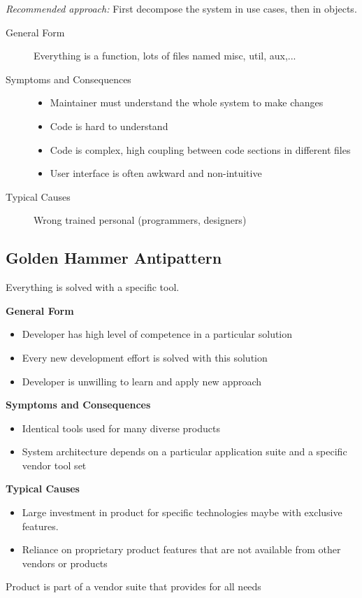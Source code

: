 \textit{Recommended approach:} First decompose the system in use cases, then in objects.

\begin{description}
  \item[General Form] Everything is a function, lots of files named misc, util, aux,...
  \item[Symptoms and Consequences] \hfill
  \begin{itemize}
    \item Maintainer must understand the whole system to make changes
     \item Code is hard to understand
     \item Code is complex, high coupling between code sections in different files
     \item User interface is often awkward and non-intuitive
  \end{itemize}
  \item[Typical Causes] Wrong trained personal (programmers, designers)
\end{description}
\newpage

\subsection{Golden Hammer Antipattern}
Everything is solved with a specific tool.
\begin{description}
	\item \textbf{General Form}
	\begin{itemize}
		\item Developer has high level of competence in a particular solution
	    \item Every new development effort is solved with this solution
	    \item Developer is unwilling to learn and apply new approach
	\end{itemize}
	\item \textbf{Symptoms and Consequences}
	\begin{itemize}
	  	\item Identical tools used for many diverse products
	  	\item System architecture depends on a particular application suite and a
  	specific vendor tool set
	\end{itemize}
	\item \textbf{Typical Causes}
	\begin{itemize}
	  	\item Large investment in product for specific technologies maybe with exclusive features.
	  	\item Reliance on proprietary product features that are not available from
	  	other vendors or products
	\end{itemize}
	\item[Known Exceptions] Product is part of a vendor suite that provides for all needs
\end{description}
\newpage

